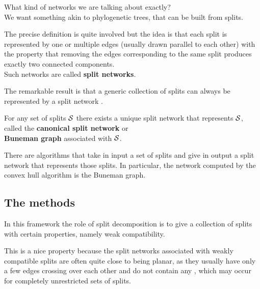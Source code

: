 \documentclass[./main.tex]{subfiles}
\begin{document}
What kind of networks we are talking about exactly? \\
We want something akin to phylogenetic trees, that can be built from splits.

The precise definition is quite involved but the idea is that each split is represented by one or multiple edges (usually drawn parallel to each other) with the property that removing the edges corresponding to the same split produces exactly two connected components. \\
Such networks are called \textbf{split networks}.\footnotemark

\begin{figure}[h]
    \centering
\end{figure}


The remarkable result is that a generic collection of splits can always be represented by a split network \cites[§5.6]{HRS11}.
\begin{remarklike}[Fact]
    For any set of splits ${\mathcal{S}}$ there exists a unique split network that represents ${\mathcal{S}}$, called the \textbf{canonical split network} or \\
    \bsp \textbf{Buneman graph} associated with ${\mathcal{S}}$.
\end{remarklike}

There are algorithms that take in input a set of splits and give in output a split network that represents those splits. In particular, the network computed by the convex hull algorithm is the Buneman graph.

\clearpage


\subsection*{The methods}

In this framework the role of split decomposition is to give a collection of splits with certain properties, namely weak compatibility. 

This is a nice property because the split networks associated with weakly compatible splits are often quite close to being planar, as they usually have only a few edges crossing over each other and do not contain any , which may occur for completely unrestricted sets of splits.
\end{document}
